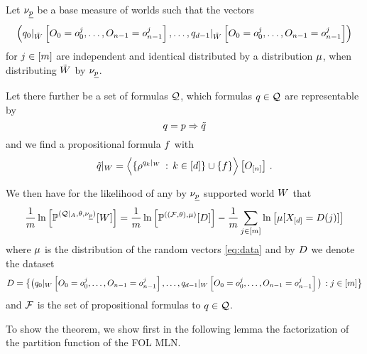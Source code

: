 \begin{theorem}\label{the:FOLworldToPLdataset}
	Let $\nu_{\underline{p}}$ be a base measure of worlds such that the vectors
	\begin{align} \label{eq:data}
		\left(  {q_{0}}|_{\tilde{W}} \left[O_{0}=o_{0}^j,\ldots,O_{n-1}=o_{n-1}^j\right], \ldots,
			{q_{d-1}}|_{\tilde{W}} \left[O_{0}=o_{0}^j,\ldots,O_{n-1}=o_{n-1}^j\right]
		\right) 
	\end{align}
	for $j\in[m]$ are independent and identical distributed by a distribution $\mu$, when distributing $\tilde{W}$ by $\nu_{\underline{p}}$.

	Let there further be a set of formulas $\mathcal{Q}$, which formulas $q\in\mathcal{Q}$ are representable by 
		\[ q = p \Rightarrow \tilde{q} \]
	and we find a propositional formula $f$ with
		\[ {\tilde{q}}|_{W} = \left\langle \{\rho^{{q_{k}}|_{W}} \, : \, k\in[d] \} \cup \{f \}\right\rangle \left[ O_{[n]} \right] \, . \]
		
		
	We then have for the likelihood of any by $\nu_{\underline{p}}$ supported world $W$ that
		\[ 	\frac{1}{m} \ln \left[ \mathbb{P}^{(\mathcal{Q} |_{A},\theta , \nu_{\underline{p}})} [W] \right] = 	\frac{1}{m} \ln \left[ \mathbb{P}^{((\mathcal{F},\theta),\mu)} [D] \right] - \frac{1}{m} \sum_{j\in[m]} \ln \left[ \mu[X_{[d]} = D({j})] \right] \]
	where $\mu$ is the distribution of the random vectors \eqref{eq:data} and by $D$ we denote the dataset
	\begin{align*}
		D = \big\{\big( {q_{0}}|_{W} \left[O_{0}=o_{0}^j,\ldots,O_{n-1}=o_{n-1}^j\right], \ldots ,
				 {q_{d-1}}|_{W} \left[O_{0}=o_{0}^j,\ldots,O_{n-1}=o_{n-1}^j\right] \big) \, : j\in[m] \big\}
	\end{align*}
	and $\mathcal{F}$ is the set of propositional formulas to $q\in\mathcal{Q}$.
\end{theorem}

To show the theorem, we show first in the following lemma the factorization of the partition function of the FOL MLN.

